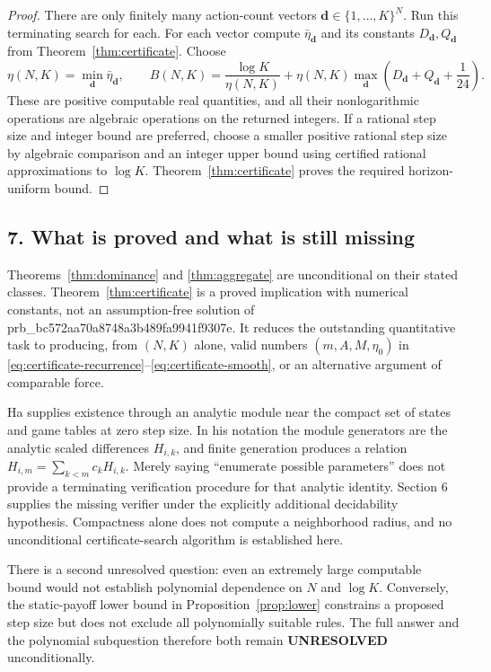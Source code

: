 \documentclass[11pt]{article}
\begin{document}
\begin{proof}
There are only finitely many action-count vectors
$\mathbf d\in\{1,\ldots,K\}^N$. Run this terminating search for each.
For each vector compute $\bar\eta_{\mathbf d}$ and its constants
$D_{\mathbf d},Q_{\mathbf d}$ from Theorem~\ref{thm:certificate}.
Choose
\[
 \eta(N,K)=\min_{\mathbf d}\bar\eta_{\mathbf d},\qquad
 B(N,K)=\frac{\log K}{\eta(N,K)}
     +\eta(N,K)\max_{\mathbf d}
                 \left(D_{\mathbf d}+Q_{\mathbf d}+\frac1{24}\right).
\]
These are positive computable real quantities, and all their nonlogarithmic
operations are algebraic operations on the returned integers. If a
rational step size and integer bound are preferred, choose a smaller
positive rational step size by algebraic comparison and an integer upper
bound using certified rational approximations to $\log K$.
Theorem~\ref{thm:certificate} proves the required horizon-uniform bound.
\end{proof}

\subsection*{7. What is proved and what is still missing}
Theorems~\ref{thm:dominance} and \ref{thm:aggregate} are unconditional
on their stated classes. Theorem~\ref{thm:certificate} is a proved
implication with numerical constants, not an assumption-free solution of
prb_bc572aa70a8748a3b489fa9941f9307e. It reduces the outstanding quantitative task to producing,
from $(N,K)$ alone, valid numbers $(m,A,M,\eta_0)$ in
\eqref{eq:certificate-recurrence}--\eqref{eq:certificate-smooth}, or
an alternative argument of comparable force.

Ha supplies existence through an analytic module near the compact set of
states and game tables at zero step size. In his notation the module
generators are the analytic scaled differences $H_{i,k}$, and finite
generation produces a relation $H_{i,m}=\sum_{k<m}c_kH_{i,k}$.
Merely saying ``enumerate possible parameters'' does not provide a
terminating verification procedure for that analytic identity. Section 6
supplies the missing verifier under the explicitly additional decidability
hypothesis. Compactness alone does not compute a neighborhood radius, and
no unconditional certificate-search algorithm is established here.

There is a second unresolved question: even an extremely large computable
bound would not establish polynomial dependence on $N$ and $\log K$.
Conversely, the static-payoff lower bound in
Proposition~\ref{prop:lower} constrains a proposed step size but does not
exclude all polynomially suitable rules. The full answer and the polynomial
subquestion therefore both remain \textbf{UNRESOLVED} unconditionally.
\end{document}
